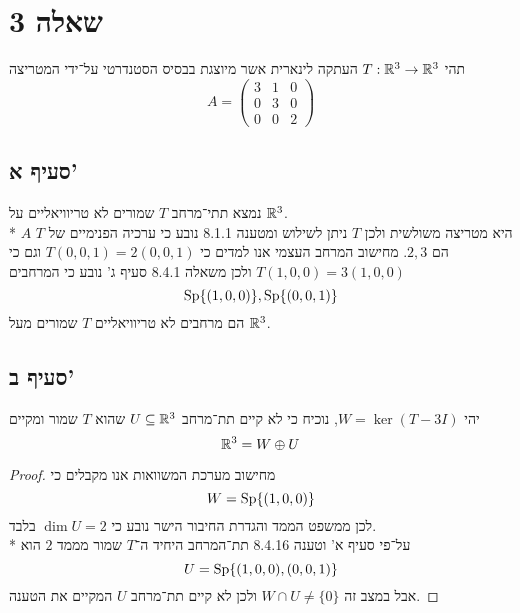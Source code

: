 \section{שאלה 3}
תהי $T : \mathbb{R}^3 \to \mathbb{R}^3$ העתקה לינארית אשר מיוצגת בבסיס הסטנדרטי על־ידי המטריצה
\[
	A = \begin{pmatrix}
		3 & 1 & 0 \\
		0 & 3 & 0 \\
		0 & 0 & 2
	\end{pmatrix}
\]
\subsection{סעיף א'}
נמצא תתי־מרחב $T$ שמורים לא טריוויאליים על $\mathbb{R}^3$. \\*
$A$ היא מטריצה משולשית ולכן $T$ ניתן לשילוש ומטענה 8.1.1 נובע כי ערכיה הפנימיים של $T$ הם $2, 3$.
מחישוב המרחב העצמי אנו למדים כי $T(0, 0, 1) = 2(0, 0, 1)$ וגם כי $T(1, 0, 0) = 3(1, 0, 0)$ ולכן משאלה 8.4.1 סעיף ג' נובע כי המרחבים
\[
	\operatorname{Sp}\{ (1, 0, 0) \},
	\operatorname{Sp}\{ (0, 0, 1) \}
\]
הם מרחבים לא טריוויאליים $T$ שמורים מעל $\mathbb{R}^3$.

\subsection{סעיף ב'}
יהי $W = \ker(T - 3I)$, נוכיח כי לא קיים תת־מרחב $U \subseteq \mathbb{R}^3$ שהוא $T$ שמור ומקיים
\[
	\mathbb{R}^3 = W \oplus U
\]
\begin{proof}
	מחישוב מערכת המשוואות אנו מקבלים כי
	\[
		W = \operatorname{Sp}\{ (1, 0, 0) \}
	\]
	לכן ממשפט הממד והגדרת החיבור הישר נובע כי $\dim U = 2$ בלבד. \\*
	על־פי סעיף א' וטענה 8.4.16 תת־המרחב היחיד ה־$T$ שמור מממד $2$ הוא
	\[
		U = \operatorname{Sp}\{ (1, 0, 0), (0, 0, 1) \}
	\]
	אבל במצב זה $W \cap U \ne \{ 0 \}$ ולכן לא קיים תת־מרחב $U$ המקיים את הטענה.
\end{proof}

